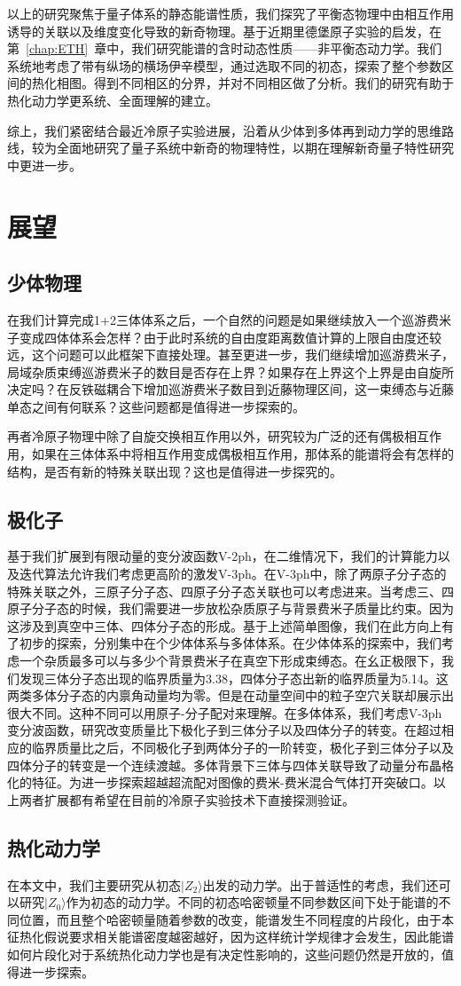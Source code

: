 以上的研究聚焦于量子体系的静态能谱性质，我们探究了平衡态物理中由相互作用诱导的关联以及维度变化导致的新奇物理。基于近期里德堡原子实验的启发，在第~\ref{chap:ETH}~章中，我们研究能谱的含时动态性质——非平衡态动力学。我们系统地考虑了带有纵场的横场伊辛模型，通过选取不同的初态，探索了整个参数区间的热化相图。得到不同相区的分界，并对不同相区做了分析。我们的研究有助于热化动力学更系统、全面理解的建立。

综上，我们紧密结合最近冷原子实验进展，沿着从少体到多体再到动力学的思维路线，较为全面地研究了量子系统中新奇的物理特性，以期在理解新奇量子特性研究中更进一步。


\section{展望}
\subsection{少体物理}
在我们计算完成1+2三体体系之后，一个自然的问题是如果继续放入一个巡游费米子变成四体体系会怎样？由于此时系统的自由度距离数值计算的上限自由度还较远，这个问题可以此框架下直接处理。甚至更进一步，我们继续增加巡游费米子，局域杂质束缚巡游费米子的数目是否存在上界？如果存在上界这个上界是由自旋所决定吗？在反铁磁耦合下增加巡游费米子数目到近藤物理区间，这一束缚态与近藤单态之间有何联系？这些问题都是值得进一步探索的。

再者冷原子物理中除了自旋交换相互作用以外，研究较为广泛的还有偶极相互作用，如果在三体体系中将相互作用变成偶极相互作用，那体系的能谱将会有怎样的结构，是否有新的特殊关联出现？这也是值得进一步探究的。

\subsection{极化子}
基于我们扩展到有限动量的变分波函数V-2ph，在二维情况下，我们的计算能力以及迭代算法允许我们考虑更高阶的激发V-3ph。在V-3ph中，除了两原子分子态的特殊关联之外，三原子分子态、四原子分子态关联也可以考虑进来。当考虑三、四原子分子态的时候，我们需要进一步放松杂质原子与背景费米子质量比约束。因为这涉及到真空中三体、四体分子态的形成。基于上述简单图像，我们在此方向上有了初步的探索，分别集中在个少体体系\cite{RuijinUniversal}与多体体系\cite{RuijinEmergence}。在少体体系的探索中，我们考虑一个杂质最多可以与多少个背景费米子在真空下形成束缚态。在幺正极限下，我们发现三体分子态出现的临界质量为3.38，四体分子态出新的临界质量为5.14。这两类多体分子态的内禀角动量均为零。但是在动量空间中的粒子空穴关联却展示出很大不同。这种不同可以用原子-分子配对来理解。在多体体系，我们考虑V-3ph变分波函数，研究改变质量比下极化子到三体分子以及四体分子的转变。在超过相应的临界质量比之后，不同极化子到两体分子的一阶转变，极化子到三体分子以及四体分子的转变是一个连续渡越。多体背景下三体与四体关联导致了动量分布晶格化的特征。为进一步探索超越超流配对图像的费米-费米混合气体打开突破口。以上两者扩展都有希望在目前的冷原子实验技术下直接探测验证。

\subsection{热化动力学}
在本文中，我们主要研究从初态$|Z_2\rangle$出发的动力学。出于普适性的考虑，我们还可以研究$|Z_0\rangle$作为初态的动力学。不同的初态哈密顿量不同参数区间下处于能谱的不同位置，而且整个哈密顿量随着参数的改变，能谱发生不同程度的片段化，由于本征热化假说要求相关能谱密度越密越好，因为这样统计学规律才会发生，因此能谱如何片段化对于系统热化动力学也是有决定性影响的，这些问题仍然是开放的，值得进一步探索。
